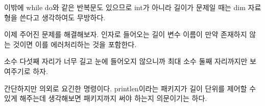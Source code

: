 \documentclass[a4paper,amsmath]{oblivoir}
\begin{document}
이밖에 while do와 같은 반복문도 있으므로 int가 아니라 길이가 문제일 때는 dim 자료형을 쓴다고 생각하여도 무방하다.


\bigskip

이제 주어진 문제를 해결해보자. 인자로 들어오는 길이 변수 이름이 만약 존재하지 않는 것이면 이를 에러처리하는 것을 포함한다. 

소수 다섯째 자리가 너무 길고 눈에 들어오지 않으니까 최대 소수 둘째 자리까지만 보여주기로 하자.


간단하지만 의외로 요긴한 명령이다. \textsf{printlen}이라는 패키지가 길이 단위를 제어할 수 있게 해주는데 생각해보면 패키지까지 써야 하는지 의문이기는 하다.

\vfill

\end{document}

